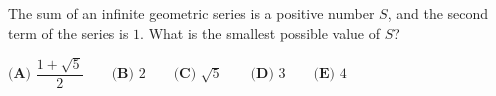 The sum of an infinite geometric series is a positive number $S$, and the second term of the series is $1$. What is the smallest possible value of $S$?

$\textbf{(A) } \dfrac{1+\sqrt5}{2} \qquad \textbf{(B) } 2 \qquad \textbf{(C) } \sqrt5 \qquad \textbf{(D) } 3 \qquad \textbf{(E) } 4$
